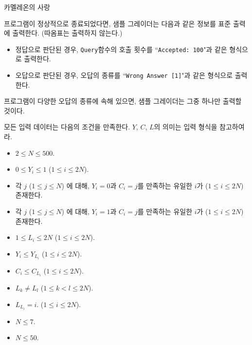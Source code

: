 \begin{problem}{카멜레온의 사랑}
	\OutputFile
	
	프로그램이 정상적으로 종료되었다면, 샘플 그레이더는 다음과 같은 정보를 표준 출력에 출력한다. (따옴표는 출력하지 않는다.)
	
	\begin{itemize}
		\item 정답으로 판단된 경우, \texttt{Query}함수의 호출 횟수를 ``\texttt{Accepted: 100}"과 같은 형식으로 출력한다.
		\item 오답으로 판단된 경우, 오답의 종류를 ``\texttt{Wrong Answer [1]}"과 같은 형식으로 출력한다.
	\end{itemize}
	
	프로그램이 다양한 오답의 종류에 속해 있으면, 샘플 그레이더는 그중 하나만 출력할 것이다.
	
	\Constraints
	
	모든 입력 데이터는 다음의 조건을 만족한다. $Y$, $C$, $L$의 의미는 입력 형식을 참고하여라.
	
	\begin{itemize}
		\item $2 \le N \le 500$.
		\item $0 \le Y_i \le 1$ ($1 \le i \le 2N$).
		\item 각 $j$ ($1 \le j \le N$) 에 대해, $Y_i = 0$과 $C_i = j$를 만족하는 유일한 $i$가 ($1 \le i \le 2N$) 존재한다.
		\item 각 $j$ ($1 \le j \le N$) 에 대해, $Y_i = 1$과 $C_i = j$를 만족하는 유일한 $i$가  ($1 \le i \le 2N$) 존재한다.
		\item $1 \le L_i \le 2N$ ($1 \le i \le 2N$).
		\item $Y_i \le Y_{L_i}$ ($1 \le i \le 2N$).
		\item $C_i \le C_{L_i}$ ($1 \le i \le 2N$).
		\item $L_k \ne L_l$ ($1 \le k < l \le 2N$).
	\end{itemize}
	
	\begin{itemize}
		\item $L_{L_i} = i$. ($1 \le i \le 2N$).
	\end{itemize}
	
	\begin{itemize}
		\item $N \le 7$.
	\end{itemize}

	\begin{itemize}
		\item $N \le 50$.
	\end{itemize}


\end{problem}
